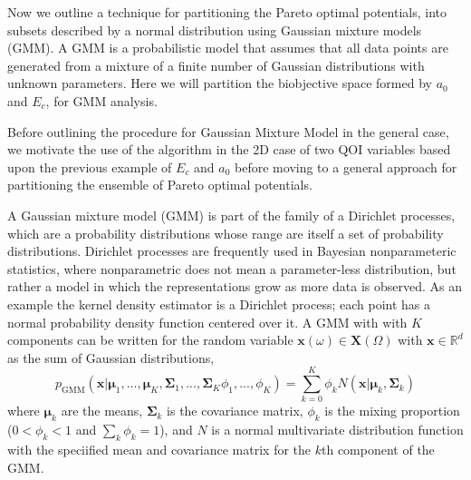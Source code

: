 Now we outline a technique for partitioning the Pareto optimal potentials, into subsets described by a normal distribution using Gaussian mixture models (GMM).  A GMM is a probabilistic model that assumes that all data points are generated from a mixture of a finite number of Gaussian distributions with unknown parameters.  Here we will partition the biobjective space formed by $a_0$ and $E_c$, for GMM analysis.

Before outlining the procedure for Gaussian Mixture Model in the general case, we motivate the use of the algorithm in the 2D case of two QOI variables based upon the previous example of $E_c$ and $a_0$ before moving to a general approach for partitioning the ensemble of Pareto optimal potentials.

A Gaussian mixture model (GMM) is part of the family of a Dirichlet processes, which are a probability distributions whose range are itself a set of probability distributions.\cite{west1994_mixturemodel}
Dirichlet processes are frequently used in Bayesian nonparameteric statistics, where nonparametric does not mean a parameter-less distribution, but rather a model in which the representations grow as more data is observed.  As an example the kernel density estimator is a Dirichlet process; each point has a normal probability density function centered over it.
A GMM with with $K$ components can be written for the random variable $\bm{x}(\omega) \in \bm{X}(\Omega)$ with $\bm{x} \in \mathbb{R}^d$ as the sum of Gaussian distributions,
\begin{equation}
\label{eq:gmm}
  p_{\text{GMM}}(\bm{x}|
                 \bm{\mu}_1,...,\bm{\mu}_K,
                 \bm{\Sigma}_1,...,\bm{\Sigma}_K
                 \phi_1,...,\phi_K)
  =
  \sum_{k=0}^K \phi_k N(\bm{x}|\bm{\mu}_k,\bm{\Sigma}_k)
\end{equation}
where $\bm{\mu}_k$ are the means, $\bm{\Sigma}_k$ is the covariance matrix, $\phi_k$ is the mixing proportion ($0<\phi_k<1$ and $\sum_k \phi_k = 1$), and $N$ is a normal multivariate distribution function with the speciified mean and covariance matrix for the $k$th component of the GMM.


